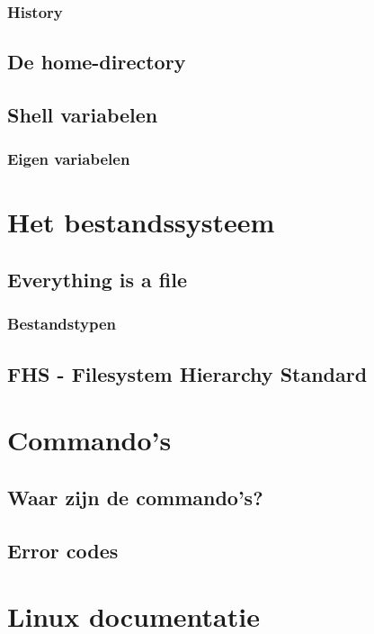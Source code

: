 \documentclass[a4paper,12pt,twoside,openright,titlepage]{book}
\begin{document}
\subsection{History}

\section{De home-directory}

\section{Shell variabelen}

\subsection{Eigen variabelen}


\chapter{Het bestandssysteem}
\section{Everything is a file}

\subsection{Bestandstypen}

\section{FHS - Filesystem Hierarchy Standard}


\chapter{Commando's}

\section{Waar zijn de commando's?}

\section{Error codes}


\chapter{Linux documentatie}

\end{document}

